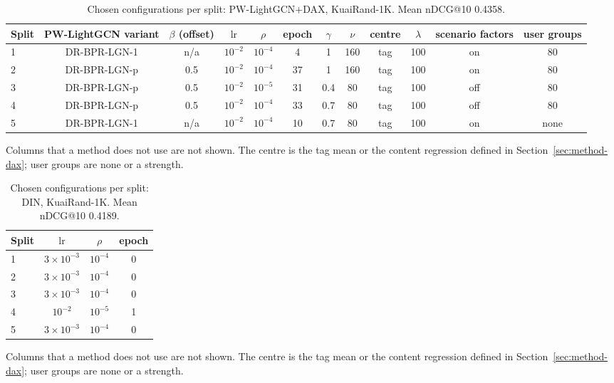 \documentclass[preprint,12pt,authoryear]{elsarticle}
\begin{document}
\begin{table}[tbp]
\centering
\footnotesize
\caption{Chosen configurations per split: PW-LightGCN+DAX, KuaiRand-1K. Mean nDCG@10 0.4358.}
\label{tab:grid13}
\begin{adjustbox}{max width=\linewidth}
\begin{tabular}{lccccccccccc}
\toprule
Split & PW-LightGCN variant & $\beta$ (offset) & $\mathrm{lr}$ & $\rho$ & epoch & $\gamma$ & $\nu$ & centre & $\lambda$ & scenario factors & user groups \\
\midrule
1 & DR-BPR-LGN-1 & n/a & $10^{-2}$ & $10^{-4}$ & 4 & 1 & 160 & tag & 100 & on & 80 \\
2 & DR-BPR-LGN-p & 0.5 & $10^{-2}$ & $10^{-4}$ & 37 & 1 & 160 & tag & 100 & on & 80 \\
3 & DR-BPR-LGN-p & 0.5 & $10^{-2}$ & $10^{-5}$ & 31 & 0.4 & 80 & tag & 100 & off & 80 \\
4 & DR-BPR-LGN-p & 0.5 & $10^{-2}$ & $10^{-4}$ & 33 & 0.7 & 80 & tag & 100 & off & 80 \\
5 & DR-BPR-LGN-1 & n/a & $10^{-2}$ & $10^{-4}$ & 10 & 0.7 & 80 & tag & 100 & on & none \\
\bottomrule
\end{tabular}
\end{adjustbox}
\par\smallskip
\begin{minipage}{\linewidth}\raggedright\footnotesize Columns that a method does not use are not shown. The centre is the tag mean or the content regression defined in Section~\ref{sec:method-dax}; user groups are none or a strength.\end{minipage}
\end{table}

\begin{table}[tbp]
\centering
\footnotesize
\caption{Chosen configurations per split: DIN, KuaiRand-1K. Mean nDCG@10 0.4189.}
\label{tab:grid14}
\begin{adjustbox}{max width=\linewidth}
\begin{tabular}{lccc}
\toprule
Split & $\mathrm{lr}$ & $\rho$ & epoch \\
\midrule
1 & $3\times10^{-3}$ & $10^{-4}$ & 0 \\
2 & $3\times10^{-3}$ & $10^{-4}$ & 0 \\
3 & $3\times10^{-3}$ & $10^{-4}$ & 0 \\
4 & $10^{-2}$ & $10^{-5}$ & 1 \\
5 & $3\times10^{-3}$ & $10^{-4}$ & 0 \\
\bottomrule
\end{tabular}
\end{adjustbox}
\par\smallskip
\begin{minipage}{\linewidth}\raggedright\footnotesize Columns that a method does not use are not shown. The centre is the tag mean or the content regression defined in Section~\ref{sec:method-dax}; user groups are none or a strength.\end{minipage}
\end{table}
\end{document}
